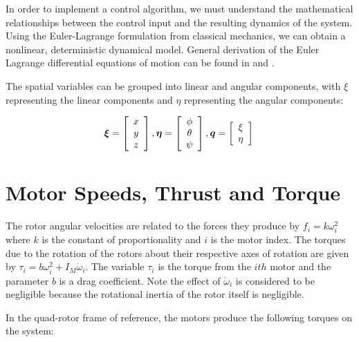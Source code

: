 In order to implement a control algorithm, we must understand the mathematical relationships between the control input and the resulting dynamics of the system. Using the Euler-Lagrange formulation from classical mechanics, we can obtain a nonlinear, deterministic dynamical model. General derivation of the Euler Lagrange differential equations of motion can be found in \cite{marion1995classical} and  \cite{cornelius1970variational}.



The spatial variables can be grouped into linear and angular components, with $\xi$ representing the linear components and $\eta$ representing the angular components:

\begin{equation}
\boldsymbol \xi = \left[ \begin{array}{c}
x\\y\\z\\
\end{array} \right] , \boldsymbol \eta =  \left[ \begin{array}{c}
\phi\\\theta\\\psi\\
\end{array} \right] , \boldsymbol q = \left[ \begin{array}{c}
\xi\\\eta\\
\end{array} \right]\\
\end{equation}

\section{Motor Speeds, Thrust and Torque}

\indent The rotor angular velocities are related to the forces they produce by $f_i = k \omega^2_i$ where $k$ is the constant of proportionality and $i$  is the motor index. The torques due to the rotation of the rotors about their respective axes of rotation are given by $\tau_{i} = b \omega^2_i + I_M \dot{\omega}_i$. The variable $ \tau_{i}$ is the torque from the $ith$ motor and the parameter $b$ is a drag coefficient. Note the effect of $\dot{\omega}_i$ is considered to be negligible because the rotational inertia of the rotor itself is negligible.

In the quad-rotor frame of reference, the motors produce the following torques on the system:


